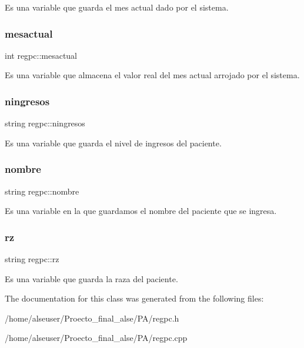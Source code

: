Es una variable que guarda el mes actual dado por el sistema. \mbox{\label{classregpc_a94335c103d8a6cbe1252c99f6ca28b37}} 
\subsubsection{\texorpdfstring{mesactual}{mesactual}}
{\footnotesize\ttfamily int regpc\+::mesactual}

Es una variable que almacena el valor real del mes actual arrojado por el sistema. \mbox{\label{classregpc_a3634b2c40b40e029561728334d2a6b72}} 
\subsubsection{\texorpdfstring{ningresos}{ningresos}}
{\footnotesize\ttfamily string regpc\+::ningresos}

Es una variable que guarda el nivel de ingresos del paciente. \mbox{\label{classregpc_a95b954b79eb473167a8e631833d756ad}} 
\subsubsection{\texorpdfstring{nombre}{nombre}}
{\footnotesize\ttfamily string regpc\+::nombre}

Es una variable en la que guardamos el nombre del paciente que se ingresa. \mbox{\label{classregpc_a76fa61f1dbcfb75c08707c4c9cb71b43}} 
\subsubsection{\texorpdfstring{rz}{rz}}
{\footnotesize\ttfamily string regpc\+::rz}

Es una variable que guarda la raza del paciente. 

The documentation for this class was generated from the following files\+:\begin{DoxyCompactItemize}
\item 
/home/alseuser/\+Proecto\+\_\+final\+\_\+alse/\+P\+A/regpc.\+h\item 
/home/alseuser/\+Proecto\+\_\+final\+\_\+alse/\+P\+A/regpc.\+cpp\end{DoxyCompactItemize}
